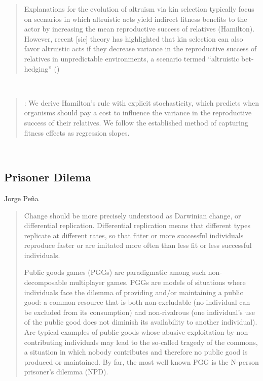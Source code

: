 \documentclass[a4paper,10pt]{article}
\begin{document}
\begin{quotation} \cite{capillaLasheras2021-betHedging}
    Explanations for the evolution of altruism via kin selection typically  focus on scenarios in which altruistic acts yield indirect fitness benefits to the actor by increasing the mean reproductive success of relatives (Hamilton).
    However, recent [sic] theory has highlighted that kin selection can also favor altruistic acts if they decrease variance in the reproductive success of relatives in unpredictable environments, a scenario termed “altruistic bet-hedging” (\cite{kennedy2018-betHedging})
\end{quotation}


\\
 

\begin{quotation} \cite{kennedy2018-betHedging}:
    We derive Hamilton’s rule with explicit stochasticity, which predicts when organisms should pay a cost to influence the variance in the reproductive success of their relatives.
    We follow the established method of capturing fitness effects as regression slopes.
\end{quotation}

\\


\subsection{Prisoner Dilema}

Jorge Peña
\begin{quotation}
    Change should be more precisely understood as Darwinian change, or differential replication.
    Differential replication means that different types replicate at different rates, so that fitter or more successful individuals reproduce faster or are imitated more often than less fit or less successful individuals.

    Public goods games (PGGs) are paradigmatic among such non-decomposable multiplayer games.
    PGGs are models of situations where individuals face the dilemma of providing and/or maintaining a public good: a common resource that is both non-excludable (no individual can be excluded from its consumption) and non-rivalrous (one individual’s use of the public good does not diminish its availability to another individual).
    Are typical examples of public goods whose abusive exploitation by non-contributing individuals may lead to the so-called tragedy of the commons, a situation in which nobody contributes and therefore no public good is produced or maintained.
    By far, the most well known PGG is the N-person prisoner’s dilemma (NPD). \cite{pena2012-phd}
\end{quotation}
\end{document}
